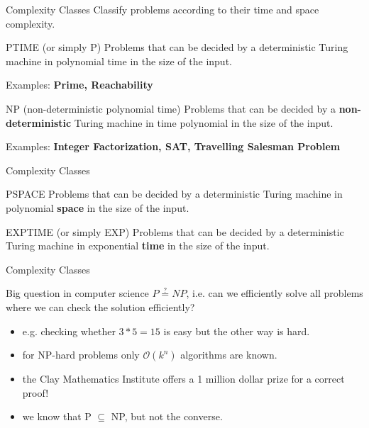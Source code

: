 \documentclass[c]{beamer}
\begin{document}
\begin{frame}{Complexity Classes}
    Classify problems according to their time and space complexity.
	\begin{block}{PTIME (or simply P)}
		Problems that can be decided by a deterministic Turing machine in polynomial time in the size of the input.
    \end{block}
    Examples: \textbf{Prime, Reachability}
    \begin{block}{NP (non-deterministic polynomial time)}
		Problems that can be decided by a \textbf{non-deterministic} Turing machine in time polynomial in the size of the input.
    \end{block}
    Examples: \textbf{Integer Factorization, SAT, Travelling Salesman Problem}
\end{frame}

\begin{frame}{Complexity Classes}
    \begin{block}{PSPACE}
		Problems that can be decided by a deterministic Turing machine in polynomial \textbf{space} in the size of the input.
    \end{block}
    \begin{block}{EXPTIME (or simply EXP)}
		Problems that can be decided by a deterministic Turing machine in exponential \textbf{time} in the size of the input.
    \end{block}
\end{frame}

\begin{frame}{Complexity Classes}
 
 \begin{block}{Big question in computer science}
 	$P\stackrel{?}{=}NP$, i.e. can we efficiently solve all problems where we can check the solution efficiently?
 \end{block}
 \begin{itemize}
 	\item e.g. checking whether $3*5 = 15$ is easy but the other way is hard.
	\item for NP-hard problems only $\mathcal{O}(k^{n})$ algorithms are known.
	\item the Clay Mathematics Institute offers a 1 million dollar prize for a correct proof!
	\item we know that P $\subseteq$ NP, but not the converse. 
\end{itemize}
\end{frame}
\end{document}
